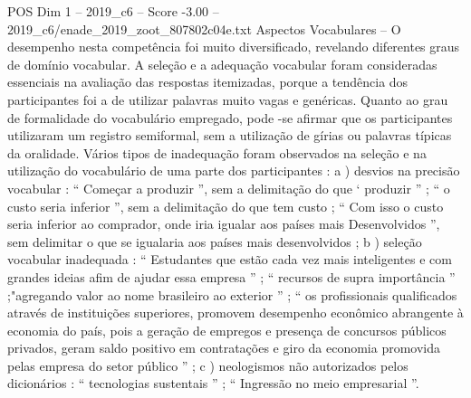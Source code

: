 \begin{textsample}{POS Dim 1 – 2019\_c6 – Score -3.00 – 2019\_c6/enade\_2019\_zoot\_807802c04e.txt}
Aspectos Vocabulares – O desempenho nesta competência foi muito diversificado, revelando diferentes graus de domínio vocabular.
A seleção e a adequação vocabular foram consideradas essenciais na avaliação das respostas itemizadas, porque a tendência dos participantes foi a de utilizar palavras muito vagas e genéricas.
Quanto ao grau de formalidade do vocabulário empregado, pode -se afirmar que os participantes utilizaram um registro semiformal, sem a utilização de gírias ou palavras típicas da oralidade.
Vários tipos de inadequação foram observados na seleção e na utilização do vocabulário de uma parte dos participantes : a ) desvios na precisão vocabular : “ Começar a produzir ”, sem a delimitação do que ‘ produzir ” ; “ o custo seria inferior ”, sem a delimitação do que tem custo ; “ Com isso o custo seria inferior ao comprador, onde iria igualar aos países mais Desenvolvidos ”, sem delimitar o que se igualaria aos países mais desenvolvidos ; b ) seleção vocabular inadequada : “ Estudantes que estão cada vez mais inteligentes e com grandes ideias afim de ajudar essa empresa ” ; “ recursos de supra importância ” ;"agregando valor ao nome brasileiro ao exterior ” ; “ os profissionais qualificados através de instituições superiores, promovem desempenho econômico abrangente à economia do país, pois a geração de empregos e presença de concursos públicos privados, geram saldo positivo em contratações e giro da economia promovida pelas empresa do setor público ” ; c ) neologismos não autorizados pelos dicionários : “ tecnologias sustentais ” ; “ Ingressão no meio empresarial ”.

\end{textsample}
